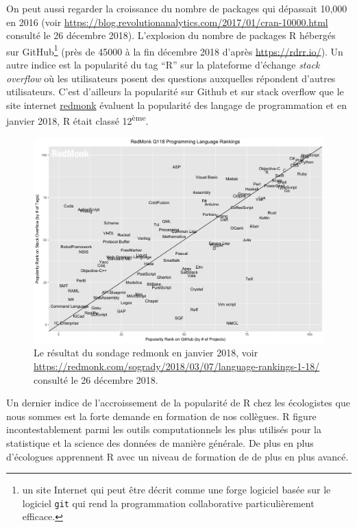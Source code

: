 \documentclass[]{article}
\begin{document}
On peut aussi regarder la croissance du nombre de packages qui dépassait 10,000 en 2016 (voir \url{https://blog.revolutionanalytics.com/2017/01/cran-10000.html} consulté le 26 décembre 2018). L'explosion du nombre de packages R hébergés sur GitHub\footnote{un site Internet qui peut être décrit comme une forge logiciel basée sur le logiciel \texttt{git} qui rend la programmation collaborative particulièrement efficace.} (près de
45000 à la fin décembre 2018 d'après \url{https://rdrr.io/}). Un autre indice est la popularité du tag ``R'' sur la plateforme d'échange \emph{stack overflow} où les utilisateurs posent des questions auxquelles répondent d'autres utilisateurs. C'est d'ailleurs la popularité sur Github et sur stack overflow que le site internet \href{https://redmonk.com/}{redmonk} évaluent la popularité des langage de programmation et en janvier 2018, R était classé 12\textsuperscript{ème}.

\begin{figure}
\centering
\includegraphics{img/chap2/rank_18.png}
\caption{Le résultat du sondage redmonk en janvier 2018, voir \url{https://redmonk.com/sogrady/2018/03/07/language-rankings-1-18/} consulté le 26 décembre 2018.}
\end{figure}

Un dernier indice de l'accroissement de la popularité de R chez les écologistes que nous sommes est la forte demande en formation de nos collègues. R figure incontestablement parmi les outils computationnels les plus utilisés pour la statistique et la science des données de manière générale. De plus en plus d'écologues apprennent R avec un niveau de formation de de plus en plus avancé.
\end{document}
